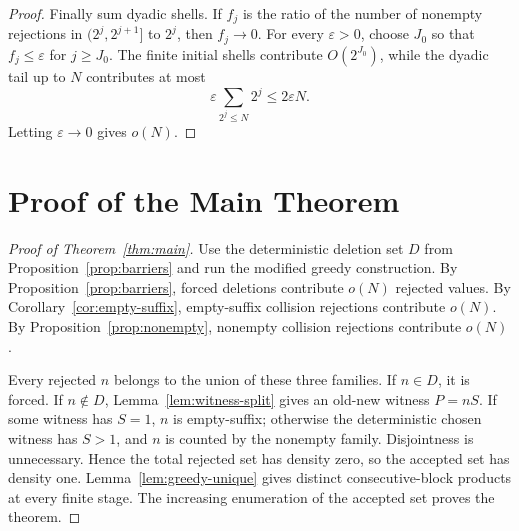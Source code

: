\documentclass[11pt]{article}
\theoremstyle{definition}
\newcommand{\eps}{\varepsilon}
\newcommand{\1}{\mathbf 1}
\begin{document}
\begin{proof}
Finally sum dyadic shells.  If \(f_j\) is the ratio of the number of nonempty
rejections in \((2^j,2^{j+1}]\) to \(2^j\), then \(f_j\to0\).  For every
\(\eps>0\), choose \(J_0\) so that \(f_j\le\eps\) for \(j\ge J_0\).  The
finite initial shells contribute \(O(2^{J_0})\), while the dyadic tail up to
\(N\) contributes at most
\[
  \eps\sum_{2^j\le N}2^j\le2\eps N.
\]
Letting \(\eps\to0\) gives \(o(N)\).
\end{proof}

\section{Proof of the Main Theorem}\label{sec:main-proof}

\begin{proof}[Proof of Theorem~\ref{thm:main}]
Use the deterministic deletion set \(D\) from Proposition~\ref{prop:barriers}
and run the modified greedy construction.  By
Proposition~\ref{prop:barriers}, forced deletions contribute \(o(N)\) rejected
values.  By Corollary~\ref{cor:empty-suffix}, empty-suffix collision
rejections contribute \(o(N)\).  By Proposition~\ref{prop:nonempty},
nonempty collision rejections contribute \(o(N)\).

Every rejected \(n\) belongs to the union of these three families.  If
\(n\in D\), it is forced.  If \(n\notin D\), Lemma~\ref{lem:witness-split}
gives an old-new witness \(P=nS\).  If some witness has \(S=1\), \(n\) is
empty-suffix; otherwise the deterministic chosen witness has \(S>1\), and
\(n\) is counted by the nonempty family.  Disjointness is unnecessary.  Hence
the total rejected set has density zero, so the accepted set has density one.
Lemma~\ref{lem:greedy-unique} gives distinct consecutive-block products at
every finite stage.  The increasing enumeration of the accepted set proves the
theorem.
\end{proof}
\end{document}

